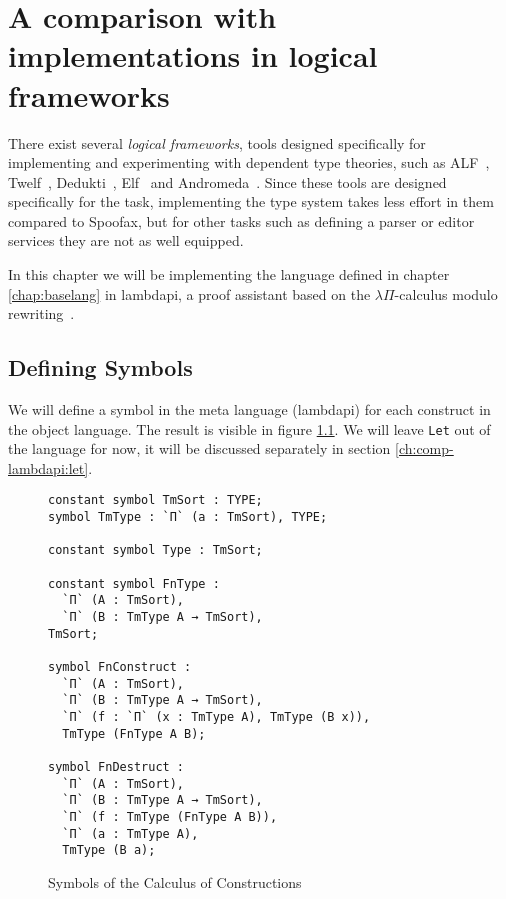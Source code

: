 \chapter{A comparison with implementations in logical frameworks}
\label{ch:comp-lambdapi}

There exist several \emph{logical frameworks}, tools designed specifically for implementing and experimenting with dependent type theories, such as ALF~\cite{MagnussonN93}, Twelf~\cite{PfenningS99}, Dedukti~\cite{BoespflugCH12}, Elf~\cite{pfenning_1991} and Andromeda~\cite{BauerHP20}. Since these tools are designed specifically for the task, implementing the type system takes less effort in them compared to Spoofax, but for other tasks such as defining a parser or editor services they are not as well equipped. 

In this chapter we will be implementing the language defined in chapter \ref{chap:baselang} in lambdapi, a proof assistant based on the $\lambda \Pi$-calculus modulo rewriting~\cite{BoespflugCH12}. 

\section{Defining Symbols}

We will define a symbol in the meta language (lambdapi) for each construct in the object language. The result is visible in figure \ref{fig:lp-symbols}. We will leave \verb|Let| out of the language for now, it will be discussed separately in section \ref{ch:comp-lambdapi:let}.

\begin{figure}[ht]
\begin{lstlisting}
constant symbol TmSort : TYPE;
symbol TmType : `Π` (a : TmSort), TYPE;

constant symbol Type : TmSort;

constant symbol FnType :
  `Π` (A : TmSort), 
  `Π` (B : TmType A → TmSort), 
TmSort;

symbol FnConstruct :
  `Π` (A : TmSort), 
  `Π` (B : TmType A → TmSort), 
  `Π` (f : `Π` (x : TmType A), TmType (B x)), 
  TmType (FnType A B);

symbol FnDestruct :
  `Π` (A : TmSort), 
  `Π` (B : TmType A → TmSort), 
  `Π` (f : TmType (FnType A B)),
  `Π` (a : TmType A),
  TmType (B a);
\end{lstlisting}
	\caption{Symbols of the Calculus of Constructions}
\label{fig:lp-symbols}
\end{figure}


